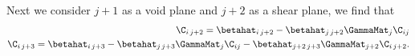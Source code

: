 Next we consider $j +1$ as a void plane and $j + 2$ as a shear plane, we find that
\begin{eqnarray}
\C_{i \, j+2} = \betahat_{i \, j+2} - \betahat_{j \, j + 2} \GammaMat_j \C_{i j}\\
\C_{i \, j+3} = \betahat_{i \, j+3} - \betahat_{j \, j + 3} \GammaMat_j \C_{i j} - \betahat_{j+2 \, j+3} \GammaMat_{j+2} \C_{i \, j+2}.
\end{eqnarray}